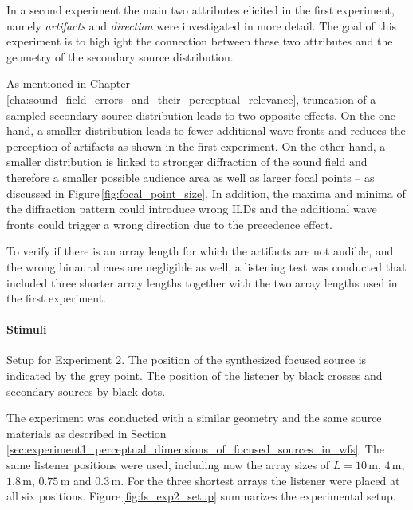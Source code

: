 In a second experiment the main two attributes elicited in the first experiment,
namely \emph{artifacts} and \emph{direction} were investigated in more detail.
The goal of this experiment is to highlight the connection between these two
attributes and the geometry of the secondary source distribution.

As mentioned in
Chapter\,\ref{cha:sound_field_errors_and_their_perceptual_relevance}, truncation
of a sampled secondary source distribution leads to two opposite
effects. On the one hand, a smaller distribution leads to fewer additional
wave fronts and reduces the perception of artifacts as shown in the first
experiment. On the other hand, a smaller distribution is linked to stronger
diffraction of the sound field and therefore a smaller possible audience area
as well as larger focal points -- as discussed in
Figure\,\ref{fig:focal_point_size}.
In addition, the maxima and minima of the diffraction pattern could introduce
wrong \acp{ILD} and the additional wave fronts could trigger a wrong direction
due to the precedence effect.

To verify if there is an array length for which the artifacts are not audible,
and the wrong binaural cues are negligible as well, a listening test was
conducted that included three shorter array lengths together with the two
array lengths used in the first experiment.



\paragraph{Stimuli}
%
\begin{marginfigure}[-8cm]
    \ft
    
    \caption{Setup for Experiment 2. The position of the synthesized focused
    source is indicated by the grey point. The position of the listener by black
    crosses and secondary sources by black dots.
        }
    \label{fig:fs_exp2_setup}
\end{marginfigure}
%
The experiment was conducted with a similar geometry and the same source materials
as described in
Section\,\ref{sec:experiment1_perceptual_dimensions_of_focused_sources_in_wfs}.
The same listener positions were used, including now the array sizes of
$L = 10$\,m, $4$\,m, $1.8$\,m, $0.75$\,m and $0.3$\,m.
For the three shortest arrays the listener were placed at all six positions.
Figure\,\ref{fig:fs_exp2_setup} summarizes the experimental
setup.


